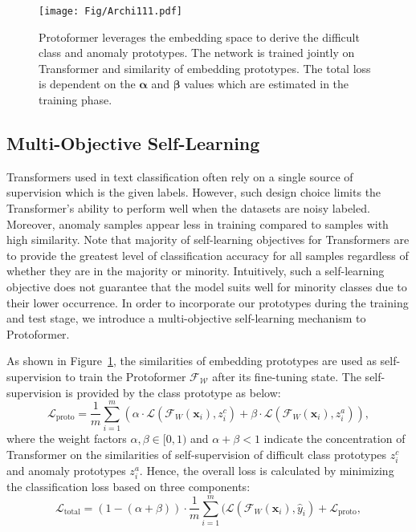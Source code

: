 \documentclass[letterpaper]{article} \usepackage{aaai22}  \usepackage{times}  \usepackage{helvet}  \usepackage{courier}  \usepackage{amsmath,amssymb}
\begin{document}
\begin{figure}[!t]
 \centering
 \texttt{[image: Fig/Archi111.pdf]}
 \caption{Protoformer leverages the embedding space to derive the difficult class and anomaly prototypes. The network is trained jointly on Transformer and similarity of embedding prototypes. The total loss is dependent
 on the $\mathbf{\alpha}$ and $\mathbf{\beta}$ values which are estimated in the training phase.}
 \label{fig:methodOverview}
  \vspace{-2mm}

\end{figure}

\subsection{Multi-Objective Self-Learning}
\label{subsec:self-learning}
Transformers used in text classification often rely on a single source of supervision which is the given labels. However, such design choice limits the Transformer's ability to perform well when the datasets are noisy labeled. Moreover, anomaly samples appear less in training compared to samples with high similarity. Note that majority of self-learning objectives for Transformers are to provide the greatest level of classification accuracy for all samples regardless of whether they are in the majority or minority. Intuitively, such a self-learning objective does not guarantee that the model suits well for minority classes due to their lower occurrence.
In order to incorporate our prototypes during the training and test stage, we introduce a multi-objective self-learning mechanism to Protoformer.


As shown in Figure~\ref{fig:methodOverview}, the similarities of embedding prototypes are used as self-supervision to train the Protoformer $\mathcal{F_W}$ after its fine-tuning state. The self-supervision is provided by the class prototype as below:
 \begin{equation}
 \mathcal{L}_{\text{proto}} = \frac{1}{m}\sum_{i=1}^m(\alpha \cdot \mathcal{L}(\mathcal{F}_{W}(\mathbf{x}_i),z^{c}_{i}) +\beta \cdot \mathcal{L}(\mathcal{F}_{W}(\mathbf{x}_i),z^{a}_{i})),
\end{equation}
where the weight factors $\alpha,\beta\in [0,1)$ and $\alpha+\beta < 1$ indicate the concentration of Transformer on the similarities of self-supervision of difficult class prototypes $z^{c}_{i}$ and anomaly prototypes $z^{a}_{i}$.
Hence, the overall loss is calculated by minimizing the classification loss based on three components:
\begin{equation} \label{eq:7}
 \mathcal{L}_{\text{total}} = (1-(\alpha+\beta))\cdot \frac{1}{m}\sum_{i=1}^m(\mathcal{L}(\mathcal{F}_{W}(\mathbf{x}_i),\hat{y}_{i}) + \mathcal{L}_{\text{proto}},
\end{equation}
\end{document}
